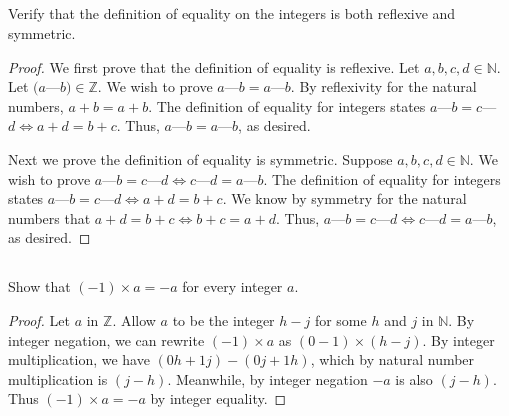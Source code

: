 \documentclass[../../main.tex]{subfiles}
\begin{document}

\subsection{}
\begin{q}
    Verify that the definition of equality on the integers is both reflexive and symmetric.
\end{q}
\begin{proof}
    We first prove that the definition of equality is reflexive.
    Let $a, b, c, d \in \mathbb{N}$.
    Let $(a$---$b) \in \mathbb{Z}$.
    We wish to prove $a$---$b = a$---$b$.
    By reflexivity for the natural numbers, $a + b = a + b$.
    The definition of equality for integers states $a$---$b = c$---$d \iff a + d = b + c$.
    Thus, $a$---$b = a$---$b$, as desired. 

    Next we prove the definition of equality is symmetric.
    Suppose $a, b, c, d \in \mathbb{N}$.
    We wish to prove $a$---$b = c$---$d \iff c$---$d = a$---$b$.
    The definition of equality for integers states $a$---$b = c$---$d \iff a + d = b + c$.
    We know by symmetry for the natural numbers that $a + d = b + c \iff b + c = a + d$.
    Thus, $a$---$b = c$---$d \iff c$---$d = a$---$b$, as desired.
\end{proof}

\addtocounter{subsection}{1}
\subsection{}
\begin{q}
    Show that $(-1) \times a = -a$ for every integer $a$.
\end{q}
\begin{proof}
    Let $a$ in $\mathbb{Z}$. Allow $a$ to be the integer $h-j$ for some $h$ and $j$ in $\mathbb{N}$. By integer negation, we can rewrite $(-1) \times a$ as $(0-1) \times (h-j)$. By integer multiplication, we have $(0h + 1j) - (0j + 1h)$, which by natural number multiplication is $(j-h)$. Meanwhile, by integer negation $-a$ is also $(j-h)$. Thus $(-1) \times a = -a$ by integer equality. 
\end{proof}

\pagebreak
\end{document}
